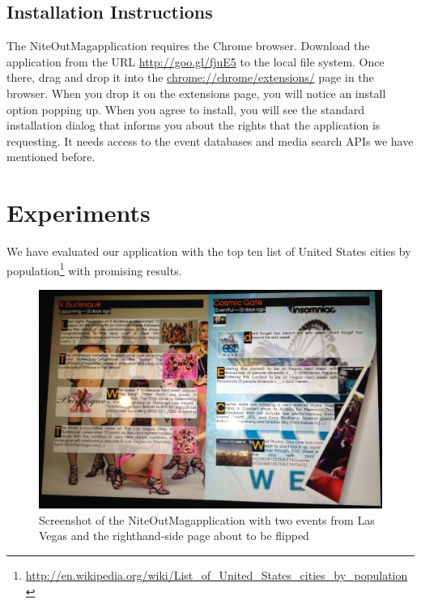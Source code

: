 \documentclass{acm_proc_article-sp}
\begin{document}
{\subsection{Installation Instructions}
The NiteOutMag\texttrademark application requires the Chrome browser. Download the application from the URL \url{http://goo.gl/fjuE5} to the local file system.
Once there, drag and drop it into the \url{chrome://chrome/extensions/} page in the browser. When you drop it on the extensions page, you will notice an install option popping up. When you agree to install, you will see the standard installation dialog that informs you about the rights that the application is requesting. It needs access to the event databases and media search APIs we have mentioned before.


\section{Experiments}                                                       \label{sec:experiments}
We have evaluated our application with the top ten list of United States cities by population\footnote{\url{http://en.wikipedia.org/wiki/List_of_United_States_cities_by_population}} with promising results.

\begin{figure}[b!]
\centering
\includegraphics[width=1.0\columnwidth]{./screenshot.jpg}
\caption{Screenshot of the NiteOutMag\texttrademark application with two events from Las Vegas and the righthand-side page about to be flipped}
\label{fig:screenshot}
\end{figure}

}
\end{document}
